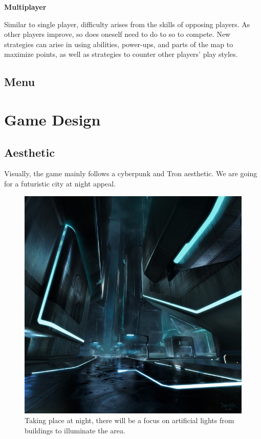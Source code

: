 \documentclass{article}
\theoremstyle{definition}
\begin{document}
\textbf{Multiplayer}

Similar to single player, difficulty arises from the skills of opposing
players. As other players improve, so does oneself need to do to so to compete.
New strategies can arise in using abilities, power-ups, and parts of the map to
maximize points, as well as strategies to counter other players' play styles.

\subsection{Menu}

\section{Game Design}

\subsection{Aesthetic}

Visually, the game mainly follows a cyberpunk and Tron aesthetic. We are going
for a futuristic city at night appeal.

\begin{figure}[htpb]
  \centering
  \includegraphics[width=0.8\linewidth]{theme01.jpg}
  \caption{Taking place at night, there will be a focus on artificial lights
  from buildings to illuminate the area.}
\label{fig:theme01}
\end{figure}
\end{document}
